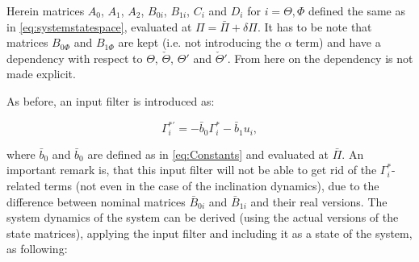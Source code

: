 \documentclass[../main.tex]{subfiles}
\begin{document}
Herein matrices $A_0$, $A_1$, $A_2$, $B_{0i}$, $B_{1i}$, $C_i$ and $D_i$ for $i = \Theta, \Phi$ defined the same as in \eqref{eq:systemstatespace}, evaluated at $\Pi = \bar{\Pi} + \delta \Pi$. It has to be note that matrices $B_{0\Phi}$ and $B_{1\Phi}$ are kept (i.e. not introducing the $\alpha$ term) and have a dependency with respect to $\Theta$, $\check{\Theta}$, $\Theta'$ and $\check{\Theta}'$. From here on the dependency is not made explicit. 

As before, an input filter is introduced as:

\begin{equation}
	\Gamma_i^{*'} = -\bar{b}_0\Gamma_i^* - \bar{b}_1 u_i,
\end{equation}

where $\bar{b}_0$ and $\bar{b}_0$ are defined as in \eqref{eq:Constants} and evaluated at  $\bar{\Pi}$. An important remark is, that this input filter will not be able to get rid of the $\Gamma_i^*$-related terms (not even in the case of the inclination dynamics), due to the difference between nominal matrices $\bar{B}_{0i}$ and $\bar{B}_{1i}$ and their real versions. The system dynamics of the system  can be derived (using the actual versions of the state matrices), applying the input filter and including it as a state of the system, as following:
\end{document}
